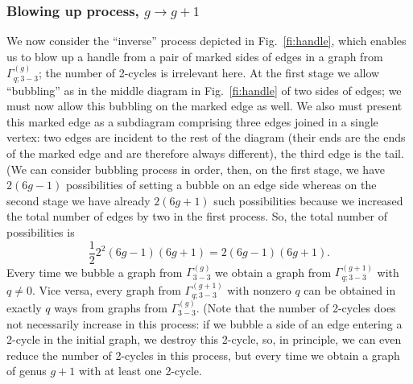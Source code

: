 \documentclass[11pt]{article}
\theoremstyle{plain}
\theoremstyle{definition}
\begin{document}
\subsubsection{Blowing up process, $g\to g+1$}

We now consider the ``inverse'' process depicted in
Fig.~\ref{fi:handle}, which enables us to blow up a handle from a
pair of marked sides of edges in a graph from
$\Gamma^{(g)}_{q;3{-}3}$; the number of 2-cycles is irrelevant here.
At the first stage we allow ``bubbling'' as in the middle diagram in
Fig.~\ref{fi:handle} of two sides of edges; we must now allow this
bubbling on the marked edge as well. We also must present this
marked edge as a subdiagram comprising three edges joined in a single
vertex: two edges are incident to the rest of the diagram (their
ends are the ends of the marked edge and are therefore always
different), the third edge is the tail. (We can consider bubbling
process in order, then, on the first stage, we have $2(6g-1)$
possibilities of setting a bubble on an edge side whereas on the
second stage we have already $2(6g+1)$ such possibilities because we
increased the total number of edges by two in the first process. So,
the total number of possibilities is
$$
\frac12 2^2 (6g-1)(6g+1)=2(6g-1)(6g+1).
$$
Every time we bubble a graph from $\Gamma^{(g)}_{3{-}3}$ we obtain a
graph from $\Gamma^{(g+1)}_{q;3{-}3}$ with $q\ne 0$. 
Vice versa, every graph from $\Gamma^{(g+1)}_{q;3{-}3}$ with nonzero $q$ can
be obtained in exactly $q$ ways from graphs from
$\Gamma^{(g)}_{3{-}3}$. (Note that the number of 2-cycles does not
necessarily increase in this process: if we bubble a side of an edge
entering a 2-cycle in the initial graph, we destroy this 2-cycle,
so, in principle, we can even reduce the number of 2-cycles in this
process, but every time we obtain a graph of genus $g+1$ with at
least one 2-cycle.
\end{document}
